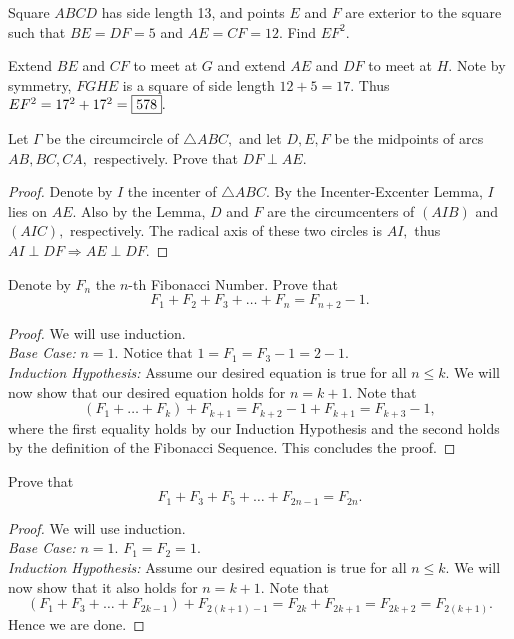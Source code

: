 \documentclass[letterpaper,oneside]{scrartcl}
\begin{document}
\begin{problem*}
  Square $ABCD$ has side length 13, and points $E$ and $F$ are exterior to the square such that $BE = DF = 5$ and $AE = CF = 12$. Find $EF^2$.
\end{problem*}
\begin{soln}
  Extend $BE$ and $CF$ to meet at $G$ and extend $AE$ and $DF$ to meet at $H.$ Note by symmetry, $FGHE$ is a square of side length $12+5=17.$ Thus $EF^2 = 17^2+17^2 = \fbox{578}.$
\end{soln}
\begin{problem*}
  Let $\Gamma$ be the circumcircle of $\triangle ABC,$ and let $D,E,F$ be the midpoints of arcs $AB,BC,CA,$ respectively. Prove that $DF\perp AE.$
\end{problem*}
\begin{proof}
  Denote by $I$ the incenter of $\triangle ABC.$ By the Incenter-Excenter Lemma, $I$ lies on $AE.$ Also by the Lemma, $D$ and $F$ are the circumcenters of $(AIB)$ and $(AIC),$ respectively. The radical axis of these two circles is $AI,$ thus $AI \perp DF \Longrightarrow AE \perp DF.$
\end{proof}
\begin{problem*}
  Denote by $F_n$ the $n$-th Fibonacci Number. Prove that
  \[F_1+F_2+F_3+\dots+F_n=F_{n+2}-1.\]
\end{problem*}
\begin{proof}
  We will use induction.\\
  \indent\textit{Base Case:} \(n=1.\) Notice that \(1=F_1=F_3-1=2-1.\)\\
  \indent\textit{Induction Hypothesis:} Assume our desired equation is true for all \(n \leq k\). We will now show that our desired equation holds for \(n = k+1.\) Note that
  \[(F_1+\dots+F_k)+F_{k+1}=F_{k+2}-1+F_{k+1}=F_{k+3}-1,\]
  where the first equality holds by our Induction Hypothesis and the second holds by the definition of the Fibonacci Sequence. This concludes the proof.
\end{proof}
\newpage
\begin{problem*}
  Prove that
  \[F_1+F_3+F_5+\dots+F_{2n-1}=F_{2n}.\]
\end{problem*}
\begin{proof}
  We will use induction.\\
  \indent\textit{Base Case:} \(n=1.\) \(F_1=F_2=1.\)\\
  \indent\textit{Induction Hypothesis:} Assume our desired equation is true for all \(n\leq k.\) We will now show that it also holds for \(n=k+1.\) Note that
  \[(F_1+F_3+\dots+F_{2k-1})+F_{2(k+1)-1}=F_{2k}+F_{2k+1}=F_{2k+2}=F_{2(k+1)}.\] Hence we are done.
\end{proof}
\end{document}

